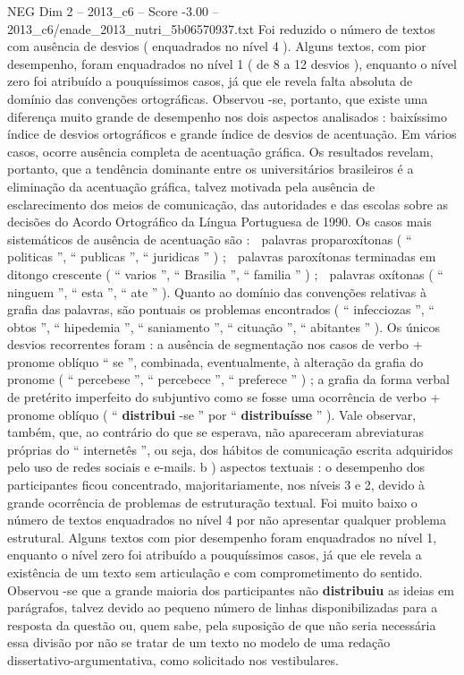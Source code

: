 \begin{textsample}{NEG Dim 2 – 2013\_c6 – Score -3.00 – 2013\_c6/enade\_2013\_nutri\_5b06570937.txt}
Foi reduzido o número de textos com ausência de desvios ( enquadrados no nível 4 ).
Alguns textos, com pior desempenho, foram enquadrados no nível 1 ( de 8 a 12 desvios ), enquanto o nível zero foi atribuído a pouquíssimos casos, já que ele revela falta absoluta de domínio das convenções ortográficas.
Observou -se, portanto, que existe uma diferença muito grande de desempenho nos dois aspectos analisados : baixíssimo índice de desvios ortográficos e grande índice de desvios de acentuação.
Em vários casos, ocorre ausência completa de acentuação gráfica.
Os resultados revelam, portanto, que a tendência dominante entre os universitários brasileiros é a eliminação da acentuação gráfica, talvez motivada pela ausência de esclarecimento dos meios de comunicação, das autoridades e das escolas sobre as decisões do Acordo Ortográfico da Língua Portuguesa de 1990.
Os casos mais sistemáticos de ausência de acentuação são :  palavras proparoxítonas ( “ politicas ”, “ publicas ”, “ juridicas ” ) ;  palavras paroxítonas terminadas em ditongo crescente ( “ varios ”, “ Brasilia ”, “ familia ” ) ;  palavras oxítonas ( “ ninguem ”, “ esta ”, “ ate ” ).
Quanto ao domínio das convenções relativas à grafia das palavras, são pontuais os problemas encontrados ( “ infecciozas ”, “ obtos ”, “ hipedemia ”, “ saniamento ”, “ cituação ”, “ abitantes ” ).
Os únicos desvios recorrentes foram : a ausência de segmentação nos casos de verbo + pronome oblíquo “ se ”, combinada, eventualmente, à alteração da grafia do pronome ( “ percebese ”, “ percebece ”, “ preferece ” ) ; a grafia da forma verbal de pretérito imperfeito do subjuntivo como se fosse uma ocorrência de verbo + pronome oblíquo ( “ \textbf{distribui} -se ” por “ \textbf{distribuísse} ” ).
Vale observar, também, que, ao contrário do que se esperava, não apareceram abreviaturas próprias do “ internetês ”, ou seja, dos hábitos de comunicação escrita adquiridos pelo uso de redes sociais e e-mails. b ) aspectos textuais : o desempenho dos participantes ficou concentrado, majoritariamente, nos níveis 3 e 2, devido à grande ocorrência de problemas de estruturação textual.
Foi muito baixo o número de textos enquadrados no nível 4 por não apresentar qualquer problema estrutural.
Alguns textos com pior desempenho foram enquadrados no nível 1, enquanto o nível zero foi atribuído a pouquíssimos casos, já que ele revela a existência de um texto sem articulação e com comprometimento do sentido.
Observou -se que a grande maioria dos participantes não \textbf{distribuiu} as ideias em parágrafos, talvez devido ao pequeno número de linhas disponibilizadas para a resposta da questão ou, quem sabe, pela suposição de que não seria necessária essa divisão por não se tratar de um texto no modelo de uma redação dissertativo-argumentativa, como solicitado nos vestibulares.

\end{textsample}
